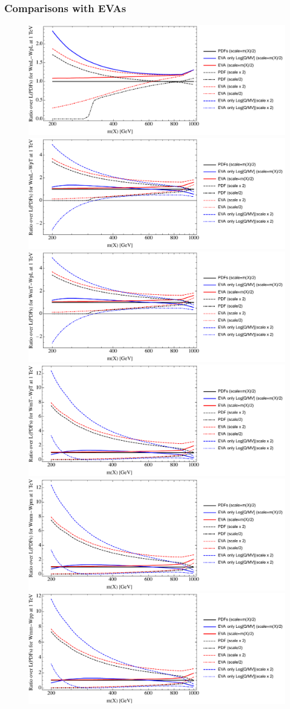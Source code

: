 \documentclass[a4paper,11pt]{article}
\begin{document}
\clearpage
\subsubsection{Comparisons with EVAs}


\begin{figure}[ht]
\includegraphics[width=0.46\linewidth]{PlotLumi/1TeV/ratios/WmL-WpL.pdf}
\includegraphics[width=0.46\linewidth]{PlotLumi/1TeV/ratios/WmL-WpT.pdf}
\includegraphics[width=0.46\linewidth]{PlotLumi/1TeV/ratios/WmT-WpL.pdf}
\includegraphics[width=0.46\linewidth]{PlotLumi/1TeV/ratios/WmT-WpT.pdf}
\includegraphics[width=0.46\linewidth]{PlotLumi/1TeV/ratios/Wmm-Wpm.pdf}
\includegraphics[width=0.46\linewidth]{PlotLumi/1TeV/ratios/Wmm-Wpp.pdf}
\end{figure}
\end{document}
